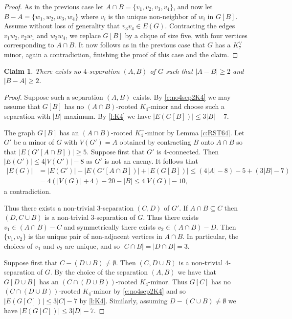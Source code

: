 \documentclass[reqno,final,12pt]{amsart}
\newtheorem{claim}{Claim}[section]
\begin{document}
{\begin{proof}
 \vskip 5pt 
  As in the previous case let $A \cap B = \{v_1,v_2,v_3,v_4\}$, and now let $B-A = \{w_1,w_2,w_3,w_4\}$ where $v_i $ is the unique non-neighbor of $w_i$ in $G[B]$. Assume without loss of generality that $v_3v_4 \in E(G)$. Contracting the edges $v_1w_2,v_2w_1$ and $w_3w_4$, we replace $G[B]$ by a clique of size five, with four vertices corresponding to $A \cap B$. It now follows as in the previous case that $G$ has a $K_7^{\vee}$ minor, again a contradiction, finishing the proof of this case and the claim.
 \end{proof}
		
\begin{claim}\label{c:no4sepNotV} There exists no $4$-separation $(A,B)$ of $G$ such that $|A-B| \geq 2$ and $|B-A| \geq 2$. 
\end{claim}	

\begin{proof} Suppose such a separation $(A,B)$ exists. By  \cref{c:no4sep2K4} we may assume that   $G[B]$ has no $(A \cap B)$-rooted $K_4$-minor and choose such a separation with $|B|$ maximum. By \cref{l:K4} we have $|E(G[B])| \leq  3|B| - 7$.
	
	The graph $G[B]$ has an $(A \cap B)$-rooted $K_4^{-}$-minor by Lemma \ref{c:RST64}. Let $G'$ be a minor of $G$ with $V(G')=A$ obtained by contracting $B$ onto $A \cap B$ so that $|E(G'[A \cap B])| \geq 5$. 
	Suppose first that $G'$ is $4$-connected. Then $|E(G')| \leq  4|V(G')| - 8$ as $G'$ is not an enemy. It follows that 
\begin{align*}|E(G)| &= |E(G')|- |E(G'[A \cap B])| + |E(G[B])|\leq (4|A|- 8) - 5 + (3|B|-7)  \\ &= 4(|V(G)|+4)-20 - |B| \leq 4|V(G)|-10,\end{align*}
a contradiction.	
	
Thus there exists a non-trivial $3$-separation $(C,D)$ of $G'$. If $A \cap B \subseteq C$ then $(D, C \cup B)$ is a non-trivial $3$-separation of $G$. Thus there exists $v_1 \in (A \cap B)-C$ and symmetrically there exists $v_2 \in (A \cap B)-D$. Then $\{v_1,v_2\}$ is the unique pair of non-adjacent vertices in $A \cap B$. In particular, the choices of $v_1$ and $v_2$ are unique, and so $|C \cap B | = |D \cap B| =  3$.

Suppose first that $C - (D \cup B) \neq \emptyset$. Then $(C, D \cup B)$ is a non-trivial $4$-separation of $G$. By the choice of the separation $(A,B)$ we have that  $G[D \cup B]$ has an  $(C \cap (D \cup B))$-rooted $K_4$-minor. Thus $G[C]$ has no  $(C \cap (D \cup B))$-rooted $K_4$-minor  by \cref{c:no4sep2K4} and so $|E(G[C])| \leq 3 |C| - 7$ by \cref{l:K4}. 
Similarly, assuming  $D - (C \cup B) \neq \emptyset$ we have $|E(G[C])| \leq 3 |D| - 7$.


\end{proof}}
\end{document}
